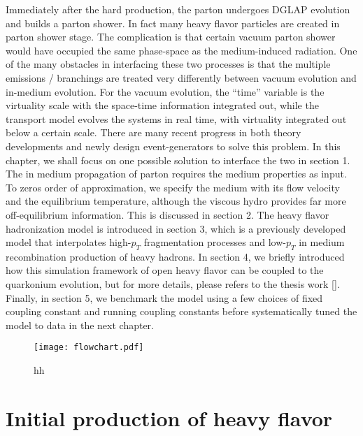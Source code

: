Immediately after the hard production, the parton undergoes DGLAP evolution and builds a parton shower.
In fact many heavy flavor particles are created in parton shower stage.
The complication is that certain vacuum parton shower would have occupied the same phase-space as the medium-induced radiation.
One of the many obstacles in interfacing these two processes is that the multiple emissions / branchings are treated very differently between vacuum evolution and in-medium evolution.
For the vacuum evolution, the ``time'' variable is the virtuality scale with the space-time information integrated out, while the transport model evolves the systems in real time, with virtuality integrated out below a certain scale.
There are many recent progress in both theory developments and newly design event-generators to solve this problem.
In this chapter, we shall focus on one possible solution to interface the two in section 1.
The in medium propagation of parton requires the medium properties as input. 
To zeros order of approximation, we specify the medium with its flow velocity and the equilibrium temperature, although the viscous hydro provides far more off-equilibrium information. 
This is discussed in section 2.
The heavy flavor hadronization model is introduced in section 3, which is a previously developed model that interpolates high-$p_T$ fragmentation processes and low-$p_T$ in medium recombination production of heavy hadrons.
In section 4, we briefly introduced how this simulation framework of open heavy flavor can be coupled to the quarkonium evolution, but for more details, please refers to the thesis work [].
Finally, in section 5, we benchmark the model using a few choices of fixed coupling constant and running coupling constants before systematically tuned the model to data in the next chapter.
\begin{figure}
\centering
\texttt{[image: flowchart.pdf]}
\caption{hh}
\label{fig:flowchart}
\end{figure}

\section{Initial production of heavy flavor}
